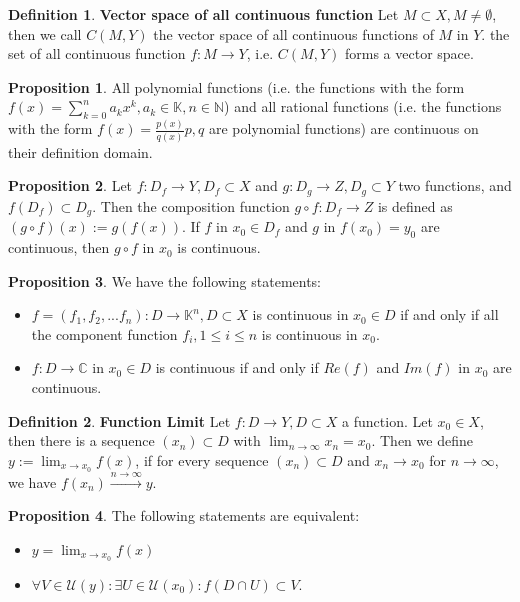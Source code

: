 \documentclass{article}
\theoremstyle{definition}
\newtheorem{defi}{Definition}[subsection]
\newtheorem{prop}{Proposition}[subsection]
\begin{document}
\begin{defi}
\textbf{Vector space of all continuous function} Let $M\subset X, M\neq \emptyset$, then we call $C(M,Y)$ the vector space of all continuous functions of $M$ in $Y$. 
the set of all continuous function $f: M\to Y$, i.e. $C(M,Y)$ forms a vector space.
\end{defi}
\begin{prop}
All polynomial functions (i.e. the functions with the form $f(x)=\sum_{k=0}^{n}a_kx^k, a_k\in\mathbb{K}, n\in\mathbb{N}$) and all rational functions (i.e. the functions with the form $f(x) = \frac{p(x)}{q(x)} p,q$ are polynomial functions) are continuous on their definition domain.
\end{prop}
\begin{prop}
Let $f: D_f \to Y, D_f \subset X$ and $g: D_g \to Z, D_g \subset Y$ two functions, and $f(D_f)\subset D_g$. Then the composition function $g\circ f: D_f \to Z$ is defined as $(g\circ f)(x) := g(f(x))$. If $f$ in $x_0\in D_f$ and $g$ in $f(x_0)=y_0$ are continuous, then $g\circ f$ in $x_0$ is continuous.
\end{prop}
\begin{prop}
We have the following statements:
\begin{itemize}
    \item $f=(f_1, f_2, ...f_n): D\to\mathbb{K}^n, D\subset X$ is continuous in $x_0\in D$ if and only if all the component function $f_i, 1\leq i \leq n$ is continuous in $x_0$.
    \item $f:D\to\mathbb{C}$ in $x_0 \in D$ is continuous if and only if $Re(f)$ and $Im(f)$ in $x_0$ are continuous.
\end{itemize}
\end{prop}
\begin{defi}
\textbf{Function Limit} Let $f: D\to Y, D\subset X$ a function. Let $x_0\in X$, then there is a sequence $(x_n)\subset D$ with $\lim_{n\to\infty}x_n=x_0$. Then we define $y:= \lim_{x\to x_0}f(x)$, if for every sequence $(x_n)\subset D$ and $x_n \to x_0$ for $n\to\infty$, we have $f(x_n)\xrightarrow{n\to\infty}y$.
\end{defi}
\begin{prop}
The following statements are equivalent:
\begin{itemize}
    \item $y=\lim_{x\to x_0}f(x)$
    \item $\forall V \in\mathcal{U}(y): \exists U\in \mathcal{U}(x_0): f(D\cap U)\subset V$.
\end{itemize}
\end{prop}
\end{document}
